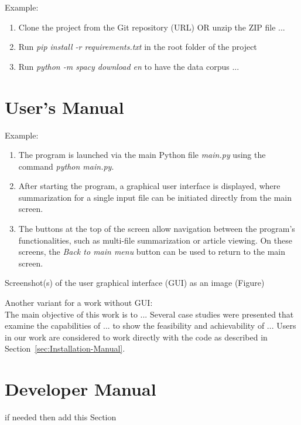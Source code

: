 Example:
\begin{enumerate}
    \item Clone the project from the Git repository (URL) OR unzip the ZIP file ...
    \item Run \emph{pip install -r requirements.txt} in the root folder of the project
    \item Run \emph{python -m spacy download en} to have the data corpus ...
\end{enumerate}



\section{User's Manual}
\label{sec:User-Manual}

Example:
\begin{enumerate}
    \item The program is launched via the main Python file \emph{main.py} using the command \emph{python main.py}. 
    
    \item After starting the program, a graphical user interface is displayed, where summarization for a single input file can be initiated directly from the main screen.

    \item The buttons at the top of the screen allow navigation between the program’s functionalities, such as multi-file summarization or article viewing. On these screens, the \emph{Back to main menu} button can be used to return to the main screen.
\end{enumerate}


Screenshot(s) of the user graphical interface (GUI) as an image (Figure)

Another variant for a work without GUI:\\
The main objective of this work is to ... 
Several case studies were presented that examine the capabilities of ... to show the feasibility and achievability of ... 
Users in our work are considered to work directly with the code as described in Section~\ref{sec:Installation-Manual}.



\section{Developer Manual}
\label{sec:Developer-Manual}

if needed then add this Section